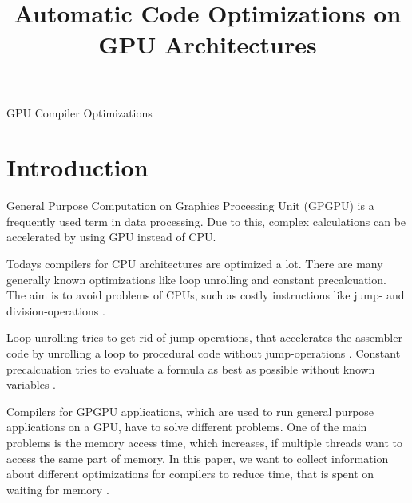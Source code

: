 \documentclass[conference]{IEEEtran}
\begin{document}
\title{Automatic Code Optimizations on GPU Architectures}

\author{
}


\maketitle

\begin{abstract}

\end{abstract}

\begin{IEEEkeywords}
GPU Compiler Optimizations
\end{IEEEkeywords}



\section{Introduction}


	General Purpose Computation on Graphics Processing Unit (GPGPU) is a frequently used term in data processing. Due to this, complex calculations can be accelerated by using GPU instead of CPU.
	
	Todays compilers for CPU architectures are optimized a lot. There are many generally known optimizations like loop unrolling and constant precalcuation. The aim is to avoid problems of CPUs, such as costly instructions like jump- and division-operations \cite{?}.
	
	Loop unrolling tries to get rid of jump-operations, that accelerates the assembler code by unrolling a loop to procedural code without jump-operations \cite{?}. Constant precalcuation tries to evaluate a formula as best as possible without known variables \cite{?}.
	
	Compilers for GPGPU applications, which are used to run general purpose applications on a GPU, have to solve different problems. One of the main problems is the memory access time, which increases, if multiple threads want to access the same part of memory. In this paper, we want to collect information about different optimizations for compilers to reduce time, that is spent on waiting for memory \cite{?}.
\end{document}
